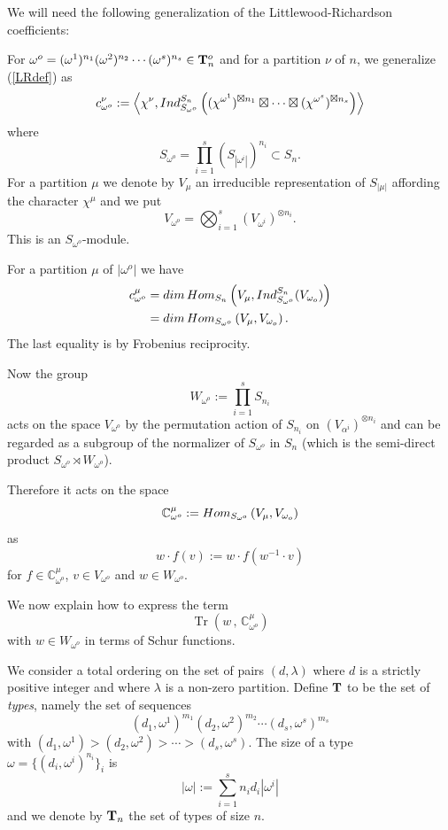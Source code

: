 \documentclass[11pt]{article}
\theoremstyle{definition}
\numberwithin{equation}{section}
\DeclareMathOperator{\Tr}{Tr} \DeclareMathOperator{\Ind}{Ind}
\begin{document}
We will need the following generalization of the Littlewood-Richardson coefficients:

For $\omega^o=(\omega^1)^{n_1}(\omega^2)^{n_2}\cdots(\omega^s)^{n_s}\in{\bf T}^o_n$ and for a partition $\nu$ of $n$, we generalize (\ref{LRdef}) as 
$$
c_{\omega^o}^\nu:=\left\langle \chi^\nu,{\rm Ind}_{S_{\omega^o}}^{S_n}\left((\chi^{\omega^1})^{\boxtimes n_1}\boxtimes\cdots\boxtimes(\chi^{\omega^s})^{\boxtimes n_s}\right)\right\rangle
$$
where 
$$
S_{\omega^o}=\prod_{i=1}^s(S_{|\omega^i|})^{n_i}\subset S_n.
$$
For a partition $\mu$ we denote by $V_\mu$ an irreducible representation of $S_{|\mu|}$ affording the character $\chi^\mu$ and we put
$$
V_{\omega^o}=\bigotimes _{i=1}^s (V_{\omega^i})^{\otimes n_i}.
$$
This is an $S_{\omega^o}$-module. 

For a partition $\mu$ of $|\omega^o|$ we have
\begin{align*}
	c_{\omega^o}^\mu&={\rm dim}\,{\rm Hom}_{S_n}\left(V_\mu,{\rm Ind}_{S_{\omega^o}}^{S_n}(V_{\omega_o})\right)\\
	&={\rm dim}\,{\rm Hom}_{S_{\omega^o}}\left(V_\mu,V_{\omega_o}\right).
\end{align*}
The last equality is by Frobenius reciprocity.

Now the group 
$$
W_{\omega^o}:=\prod_{i=1}^s S_{n_i}
$$
acts on the space $V_{\omega^o}$ by the permutation action of $S_{n_i}$ on $(V_{\alpha^i})^{\otimes n_i}$ and can be regarded as a subgroup of the normalizer of $S_{\omega^o}$ in $S_n$ (which is the semi-direct product $S_{\omega^o}\rtimes W_{\omega^o}$). 

Therefore it acts on the space
$$
\mathbb{C}_{\omega^o}^\mu:={\rm Hom}_{S_{\omega^o}}\left(V_\mu,V_{\omega_o}\right)
$$ 
as
$$
w\cdot f(v):=w\cdot f(w^{-1}\cdot v)
$$
for $f\in\mathbb{C}_{\omega^o}^\mu$, $v\in V_{\omega^o}$ and $w\in W_{\omega^o}$.


We now explain how to express the term
$$
\Tr\left(w\,,\, \mathbb{C}_{\omega^o}^\mu\right)
$$
with $w\in W_{\omega^o}$ in terms of Schur functions.


We consider a total ordering on the set of pairs $(d,\lambda)$ where $d$ is a strictly positive integer and where $\lambda$ is a non-zero partition. Define ${\bf T}$ to be the set of \emph{types}, namely the set of sequences
$$
(d_1,\omega^1)^{m_1}(d_2,\omega^2)^{m_2}\cdots(d_s,\omega^s)^{m_s}
$$
with $(d_1,\omega^1)>(d_2,\omega^2)>\cdots>(d_s,\omega^s)$. The size of a type $\omega=\{(d_i,\omega^i)^{n_i}\}_i$ is
$$
|\omega|:=\sum_{i=1}^sn_id_i|\omega^i|
$$
and we denote by ${\bf T}_n$ the set of types of size $n$.
\end{document}
